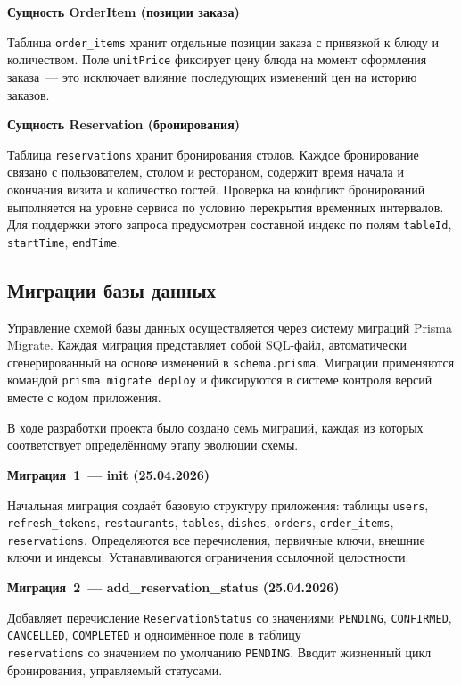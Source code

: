 \textbf{Сущность OrderItem (позиции заказа)}

Таблица \texttt{order\_items} хранит отдельные позиции заказа с привязкой
к блюду и количеством. Поле \texttt{unitPrice} фиксирует цену блюда на
момент оформления заказа~--- это исключает влияние последующих изменений
цен на историю заказов.

\textbf{Сущность Reservation (бронирования)}

Таблица \texttt{reservations} хранит бронирования столов. Каждое
бронирование связано с пользователем, столом и рестораном, содержит
время начала и окончания визита и количество гостей. Проверка на конфликт
бронирований выполняется на уровне сервиса по условию перекрытия
временных интервалов. Для поддержки этого запроса предусмотрен составной
индекс по полям \texttt{tableId}, \texttt{startTime}, \texttt{endTime}.


\subsection{Миграции базы данных}

Управление схемой базы данных осуществляется через систему миграций
Prisma Migrate. Каждая миграция представляет собой SQL-файл,
автоматически сгенерированный на основе изменений в
\texttt{schema.prisma}. Миграции применяются командой
\texttt{prisma migrate deploy} и фиксируются в системе контроля версий
вместе с кодом приложения.

В ходе разработки проекта было создано семь миграций, каждая из которых
соответствует определённому этапу эволюции схемы.

\textbf{Миграция~1~--- init (25.04.2026)}

Начальная миграция создаёт базовую структуру приложения: таблицы
\texttt{users}, \texttt{refresh\_tokens}, \texttt{restaurants},
\texttt{tables}, \texttt{dishes}, \texttt{orders},
\texttt{order\_items}, \texttt{reservations}. Определяются все
перечисления, первичные ключи, внешние ключи и индексы.
Устанавливаются ограничения ссылочной целостности.

\textbf{Миграция~2~--- add\_reservation\_status (25.04.2026)}

Добавляет перечисление \texttt{ReservationStatus} со значениями
\texttt{PENDING}, \texttt{CONFIRMED}, \texttt{CANCELLED}, \texttt{COMPLETED}
и одноимённое поле в таблицу \\ \texttt{reservations} со значением по умолчанию
\texttt{PENDING}. Вводит жизненный цикл бронирования, управляемый статусами.

